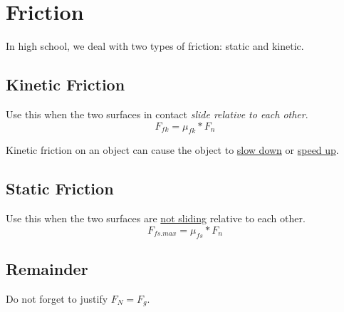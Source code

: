 \section{Friction}
In high school, we deal with two types of friction: static and kinetic.

\subsection{Kinetic Friction}
Use this when the two surfaces in contact \textit{slide relative to each other}.
\begin{equation}
    F_{fk} = \mu_{fk} * F_{n}
\end{equation}

Kinetic friction on an object can cause the object to \underline{slow down} or \underline{speed up}.

\subsection{Static Friction}
Use this when the two surfaces are \underline{not sliding} relative to each other.
\begin{equation}
    F_{fs.max} = \mu_{fs} * F_{n}
\end{equation}

\subsection{Remainder}
Do not forget to justify \underline{$F_{N} = F_{g}$}.
\newpage
{}
